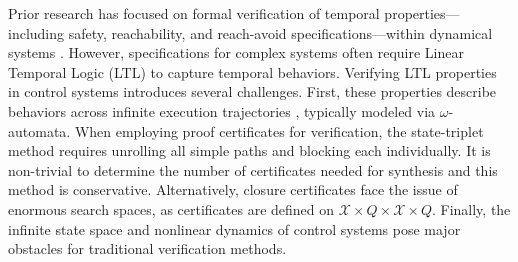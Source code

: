 Prior research has focused on formal verification of temporal properties---including safety, reachability, and reach-avoid specifications---within dynamical systems \cite{xue2021reach, vzikelic2023learning, ansaripour2023learning, vzikelic2023compositional, neustroev2025neural}. However, specifications for complex systems often require Linear Temporal Logic (LTL) \cite{pnueli1977temporal} to capture temporal behaviors. Verifying LTL properties in control systems introduces several challenges. First, these properties describe behaviors across infinite execution trajectories \cite{baier2008principles}, typically modeled via $\omega$-automata. When employing proof certificates for verification, the state-triplet method requires unrolling all simple paths and blocking each individually. It is non-trivial to determine the number of certificates needed for synthesis and this method is conservative. Alternatively, closure certificates face the issue of enormous search spaces, as certificates are defined on $\mathcal{X} \times Q \times \mathcal{X} \times Q$. Finally, the infinite state space and nonlinear dynamics of control systems pose major obstacles for traditional verification methods.




